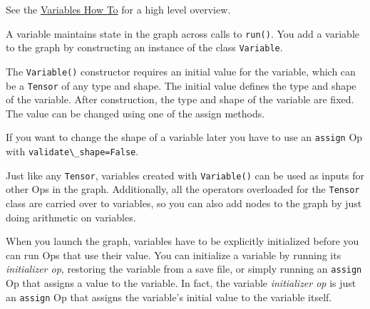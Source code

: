 See the \href{../../how_tos/variables/index.md}{Variables How To} for a
high level overview.

A variable maintains state in the graph across calls to \lstinline{run()}.
You add a variable to the graph by constructing an instance of the class
\lstinline{Variable}.

The \lstinline{Variable()} constructor requires an initial value for the
variable, which can be a \lstinline{Tensor} of any type and shape. The
initial value defines the type and shape of the variable. After
construction, the type and shape of the variable are fixed. The value
can be changed using one of the assign methods.

If you want to change the shape of a variable later you have to use an
\lstinline{assign} Op with \lstinline{validate\_shape=False}.

Just like any \lstinline{Tensor}, variables created with
\lstinline{Variable()} can be used as inputs for other Ops in the graph.
Additionally, all the operators overloaded for the \lstinline{Tensor} class
are carried over to variables, so you can also add nodes to the graph by
just doing arithmetic on variables.

\begin{Shaded}
\begin{Highlighting}[]
  

\OperatorTok{=} \OperatorTok{<}\OperatorTok{-}\OperatorTok{>}\OperatorTok{=<}\OperatorTok{-}\OperatorTok{>}\NormalTok{)}

\OperatorTok{=}  

\OperatorTok{=} \OperatorTok{+} 

\OperatorTok{+} \NormalTok{)}
\NormalTok{)}
\end{Highlighting}
\end{Shaded}

When you launch the graph, variables have to be explicitly initialized
before you can run Ops that use their value. You can initialize a
variable by running its \emph{initializer op}, restoring the variable
from a save file, or simply running an \lstinline{assign} Op that assigns a
value to the variable. In fact, the variable \emph{initializer op} is
just an \lstinline{assign} Op that assigns the variable's initial value to
the variable itself.

